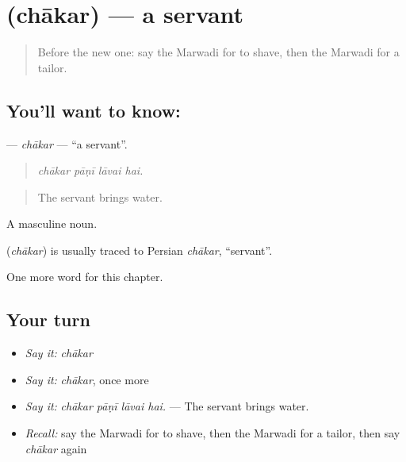 \section[\texorpdfstring{\mw{चाकर} (chākar)}{चाकर (chākar)}]{ (chākar) — a servant}

\label{lesson:MW-C265-chakar}



\begin{quote}
Before the new one: say the Marwadi for to shave, then the Marwadi for a tailor.
\end{quote}

\subsection*{You'll want to know: }
\textbf{} — \emph{chākar} — \textquotedblleft{}a servant\textquotedblright{}.

\begin{quote}
   
\end{quote}

\begin{quote}
\emph{chākar pāṇī lāvai hai.}
\end{quote}

\begin{quote}
The servant brings water.
\end{quote}

A masculine noun.

\begin{cousinweb}
\textbf{} (\emph{chākar}) is usually traced to Persian \emph{chākar}, \textquotedblleft{}servant\textquotedblright{}.
\end{cousinweb}

\begin{grammarlens}[title={What you've built}]
One more word for this chapter.
\end{grammarlens}

\subsection*{Your turn}
\begin{itemize}
\raggedright
  \item \emph{Say it:} \emph{chākar}
  \item \emph{Say it:} \emph{chākar}, once more
  \item \emph{Say it:} \emph{chākar pāṇī lāvai hai.} — The servant brings water.
  \item \emph{Recall:} say the Marwadi for to shave, then the Marwadi for a tailor, then say \emph{chākar} again
\end{itemize}

